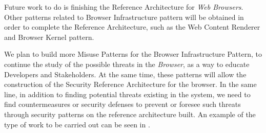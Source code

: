 \documentclass{sig-alternate-05-2015}
\begin{document}
Future work to do is finishing the Reference Architecture for \textit{Web Browsers}. Other patterns related to Browser Infrastructure pattern will be obtained in order to complete the Reference Architecture, such as the Web Content Renderer and Browser Kernel pattern. 

We plan to build more Misuse Patterns for the Browser Infrastructure Pattern, to continue the study of the possible threats in the \textit{Browser}, as a way to educate Developers and Stakeholders. At the same time, these patterns will allow the construction of the Security Reference Architecture for the browser. In the same line, in addition to finding potential threats existing in the system, we need to find countermeasures or security defenses to prevent or foresee such threats through security patterns on the reference architecture built. An example of the type of work to be carried out can be seen in \cite{Fernandez2015}.

  

\end{document}
